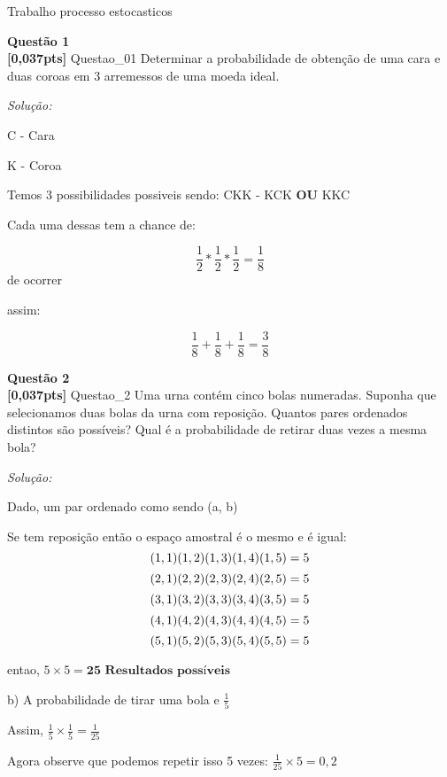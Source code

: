 \documentclass{article}
\newenvironment{problem}[2][Questão]
    { \begin{mdframed}[backgroundcolor=gray!20] \textbf{#1 #2} \\}
    {  \end{mdframed}}
\newenvironment{solution}
    {\textit{Solução:}}
    {}
\begin{document}
\begin{mdframed}[backgroundcolor=blue!20]
Trabalho processo estocasticos
\end{mdframed}

\begin{problem}{1}
\textbf{[0,037pts]} Questao\_01 Determinar a probabilidade de obtenção de uma cara e duas coroas em 3 arremessos de uma moeda ideal.

\end{problem}

\begin{solution}

C - Cara

K - Coroa

Temos 3 possibilidades possiveis sendo: CKK - KCK \textbf{OU} KKC

Cada uma dessas tem a chance de:

\[\frac{1}{2} * \frac{1}{2}  * \frac{1}{2} = \frac{1}{8}\] de ocorrer

assim:

\[\frac{1}{8} + \frac{1}{8}  + \frac{1}{8} = \frac{3}{8}\]

\end{solution}

\begin{problem}{2}
\textbf{[0,037pts]} Questao\_2 Uma urna contém cinco bolas numeradas. Suponha que selecionamos duas bolas da urna com reposição. Quantos pares ordenados distintos são possíveis? Qual é a probabilidade de retirar duas vezes a mesma bola?

\end{problem}

\begin{solution}

Dado, um par ordenado como sendo (a, b)

Se tem reposição então o espaço amostral é o mesmo e é igual:
\[ (1,1) (1,2) (1,3) (1,4) (1,5) = 5 \newline \]
\[ (2,1) (2,2) (2,3) (2,4) (2,5) = 5 \newline \]
\[ (3,1) (3,2) (3,3) (3,4) (3,5) = 5 \newline \]
\[ (4,1) (4,2) (4,3) (4,4) (4,5) = 5 \newline \]
\[ (5,1) (5,2) (5,3) (5,4) (5,5) = 5 \newline \]

entao, $5 \times 5 = \textbf{25 Resultados possíveis}$


b) A probabilidade de tirar uma bola e $\frac{1}{5}$

Assim, $\frac{1}{5} \times \frac{1}{5} = \frac{1}{25}$

Agora observe que podemos repetir isso 5 vezes: $\frac{1}{25} \times 5 = 0,2$

\end{solution}
\end{document}

